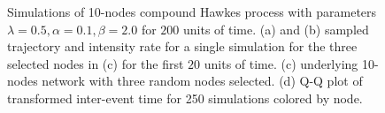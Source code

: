 \documentclass{juliacon}
\numberwithin{equation}{section}
\begin{document}
\begin{figure}
\hfil
{}
\hfil
{}
\caption{Simulations of 10-nodes compound Hawkes process with parameters \( \lambda = 0.5 , \alpha = 0.1 , \beta = 2.0 \) for \( 200 \) units of time. (a) and (b) sampled trajectory and intensity rate for a single simulation for the three selected nodes in (c) for the first \( 20 \) units of time. (c) underlying 10-nodes network with three random nodes selected. (d) Q-Q plot of transformed inter-event time for 250 simulations colored by node.}
\label{fig:hawkes}
\end{figure}
\end{document}
